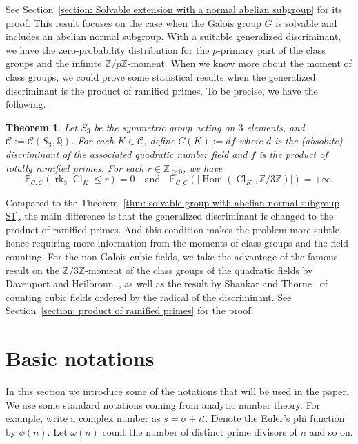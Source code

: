 \documentclass[12pt,a4paper]{amsart}
\numberwithin{equation}{section}%
\theoremstyle{plain}%
\newtheorem{theorem}{Theorem}[section]%
\theoremstyle{definition}%
\theoremstyle{remark}%
\begin{document}
	See Section~\ref{section: Solvable extension with a normal abelian subgroup} for its proof. %
	This result focuses on the case when the Galois group $G$ is solvable and includes an abelian normal subgroup.
	With a suitable generalized discriminant, we have the zero-probability distribution for the $p$-primary part of the class groups and the infinite $\mathbb{Z}/p\mathbb{Z}$-moment.
	When we know more about the moment of class groups, we could prove some statistical results when the generalized discriminant is the product of ramified primes.
	To be precise, we have the following.
	\begin{theorem}\label{thm: cubic fields S1}
		Let $S_{3}$ be the symmetric group acting on $3$ elements, and $\mathcal{C}:=\mathcal{C}(S_3,\mathbb{Q})$.
		For each $K\in\mathcal{C}$, define $C(K):=df$ where $d$ is the (absolute) discriminant of the associated quadratic number field and $f$ is the product of totally ramified primes.
		For each $r\in\mathbb{Z}_{\geq0}$, we have
		\begin{equation*}
			\mathbb{P}_{\mathcal{C},C}(\operatorname{rk}_3\operatorname{Cl}_K\leq r)=0
			\quad\text{and}\quad
			\mathbb{E}_{\mathcal{C},C}(\lvert\operatorname{Hom}(\operatorname{Cl}_{K},\mathbb{Z}/3\mathbb{Z})\rvert)=+\infty.
		\end{equation*}
	\end{theorem}
	Compared to the Theorem~\ref{thm: solvable group with abelian normal subgroup S1}, the main difference is that the generalized discriminant is changed to the product of ramified primes.
	And this condition makes the problem more subtle, hence requiring more information from the moments of class groups and the field-counting.
	For the non-Galois cubic fields, we take the advantage of the famous result on the $\mathbb{Z}/3\mathbb{Z}$-moment of the class groups of the quadratic fields by Davenport and Heilbronn~\cite{Davenport1971Cubic}, as well as the result by Shankar and Thorne~\cite{shankar2024asymptoticscubicfieldsordered} of counting cubic fields ordered by the radical of the discriminant.
	See Section~\ref{section: product of ramified primes} for the proof.
	
	\section{Basic notations}\label{section:notation}
	In this section we introduce some of the notations that will be used in the paper.
	We use some standard notations coming from analytic number theory.
	For example, write a complex number as $s=\sigma+it$.
	Denote the Euler's phi function by $\phi(n)$.
	Let $\omega(n)$ count the number of distinct prime divisors of $n$ and so on.
	
\end{document}
